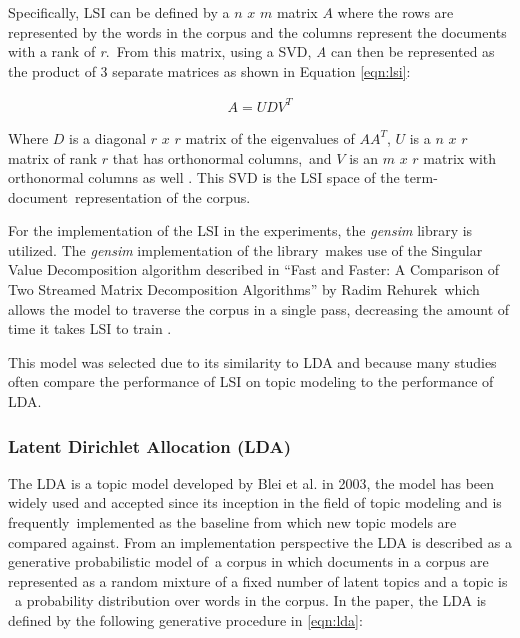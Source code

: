\documentclass[letterpaper,12pt]{article}
\begin{document}
Specifically, LSI can be defined by a $n$ $x$ $m$ matrix $A$ where the rows are represented by the words in the corpus and the columns represent the documents with a rank of \emph{r}.\
From this matrix, using a SVD, \emph{A} can then be represented as the product of 3 separate matrices as shown in Equation \ref{eqn:lsi}:

\begin{eqnarray}
		A = UDV^T
	\label{eqn:lsi}
\end{eqnarray}

Where $D$ is a diagonal $r$ $x$ $r$ matrix of the eigenvalues of $AA^T$, $U$ is a $n$ $x$ $r$ matrix of rank $r$ that has orthonormal columns,\
and $V$ is an $m$ $x$ $r$ matrix with orthonormal columns as well \cite{papadimitriou2000latent}. This SVD is the LSI space of the term-document\
representation of the corpus. 

For the implementation of the LSI in the experiments, the \emph{gensim} \cite{gensim} library is utilized. The \emph{gensim} implementation of the library\
makes use of the Singular Value Decomposition algorithm described in ``Fast and Faster: A Comparison of Two Streamed Matrix Decomposition Algorithms'' by Radim Rehurek\
which allows the model to traverse the corpus in a single pass, decreasing the amount of time it takes LSI to train \cite{rehurek2011}.

This model was selected due to its similarity to LDA and because many studies often compare the performance of LSI on topic modeling to the performance of LDA.

\subsubsection{Latent Dirichlet Allocation (LDA)}
The LDA is a topic model developed by Blei et al. in 2003, the model has been widely used and accepted since its inception in the field of topic modeling and is frequently\
implemented as the baseline from which new topic models are compared against. From an implementation perspective the LDA is described as a generative probabilistic model of\
a corpus in which documents in a corpus are represented as a random mixture of a fixed number of latent topics and a topic is \
a probability distribution over words in the corpus. In the paper, the LDA is defined by the following generative procedure in \ref{eqn:lda}:
\end{document}
